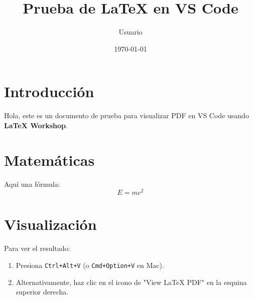 \documentclass[12pt]{article}
\title{Prueba de LaTeX en VS Code}
\author{Usuario}
\date{\today}
\begin{document}
\maketitle

\section{Introducción}
Hola, este es un documento de prueba para visualizar PDF en VS Code usando \textbf{LaTeX Workshop}.

\section{Matemáticas}
Aquí una fórmula:
\begin{equation}
    E = mc^2
\end{equation}

\section{Visualización}
Para ver el resultado:
\begin{enumerate}
    \item Presiona \texttt{Ctrl+Alt+V} (o \texttt{Cmd+Option+V} en Mac).
    \item Alternativamente, haz clic en el icono de "View LaTeX PDF" en la esquina superior derecha.
\end{enumerate}
\end{document}
